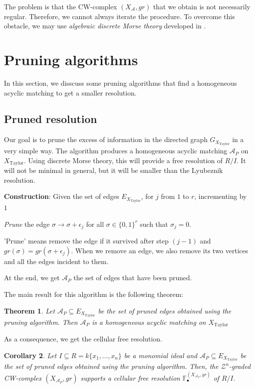 \documentclass[paper=a4, fontsize=11pt]{scrartcl} %
\theoremstyle{plain}
\newtheorem{thm}{Theorem}[section]
\newtheorem{cor}[thm]{Corollary}
\theoremstyle{definition}
\begin{document}
The problem is that the CW-complex $(X_{\mathcal{A}},gr)$ that we obtain is not necessarily regular. Therefore, we cannot always iterate the procedure. To overcome this obstacle, we may use \textit{algebraic discrete Morse theory} developed in \cite{JoWe}.

\section{Pruning algorithms}
In this section, we disscuss some pruning algorithms that find a homogeneous acyclic matching to get a smaller resolution.

\subsection{Pruned resolution}
Our goal is to prune the excess of information in the directed graph $G_{X_{\text{Taylor}}}$ in a very simple way. The algorithm produces a homogeneous acyclic matching $\mathcal{A}_P$ on $X_{\text{Taylor}}$. Using discrete Morse theory, this will provide a free resolution of $R/I$. It will not be minimal in general, but it will be smaller than the Lyubeznik resolution.

\textbf{Construction}: Given the set of edges $E_{X_{\text{Taylor}}}$, for $j$ from $1$ to $r$, incrementing by $1$

\textit{Prune} the edge $\sigma \longrightarrow \sigma + \epsilon_j$ for all $\sigma \in \lbrace 0, 1 \rbrace^r$ such that $\sigma_j = 0$.

'Prune' means remove the edge if it survived after step $(j-1)$ and $gr(\sigma) = gr(\sigma + \epsilon_j)$. When we remove an edge, we also remove its two vertices and all the edges incident to them.

At the end, we get $\mathcal{A}_P$ the set of edges that have been pruned.

The main result for this algorithm is the following theorem:
\begin{thm} \cite[Theorem 3.3]{AlFeGi17}
Let $\mathcal{A}_P \subseteq E_{X_{\text{Taylor}}}$ be the set of pruned edges obtained using the pruning algorithm. Then $\mathcal{A}_P$ is a homogeneous acyclic matching on $X_{\text{Taylor}}$
\end{thm}

As a consequence, we get the cellular free resolution.

\begin{cor} \cite[Corollary 3.4]{AlFeGi17}
Let $I \subseteq R = k \lbrace x_1, \dots, x_n \rbrace$ be a monomial ideal and $\mathcal{A}_P \subseteq E_{X_{\text{Taylor}}}$ be the set of pruned edges obtained using the pruning algorithm. Then, the $\mathcal{Z}^n$-graded CW-complex $(X_{\mathcal{A}_P},gr)$ supports a cellular free resolution $\mathbb{F}_{\bullet}^{(X_{\mathcal{A}_P},gr)}$ of $R/I$.
\end{cor}
\end{document}
